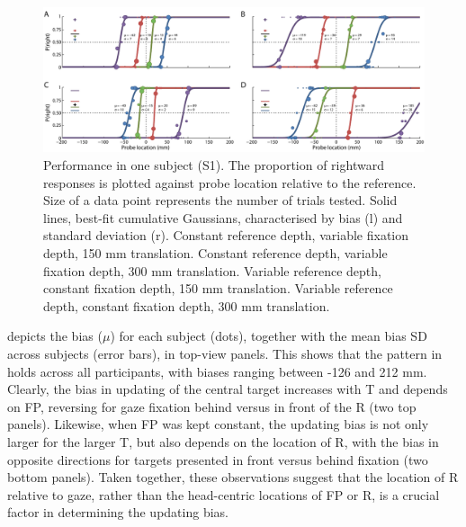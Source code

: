 \begin{figure}
    \includegraphics[width=1.0\textwidth]{src/paper2/figure2.pdf}

    \caption{Performance in one subject (S1). The proportion of rightward responses is plotted against probe location relative to the reference. Size of a data point represents the number of trials tested. Solid lines, best-fit cumulative Gaussians, characterised by bias (l) and standard deviation (r).  Constant reference depth, variable fixation depth, 150 \si{\milli\metre} translation.  Constant reference depth, variable fixation depth, 300 \si{\milli\metre} translation.  Variable reference depth, constant fixation depth, 150 \si{\milli\metre} translation.  Variable reference depth, constant fixation depth, 300 \si{\milli\metre}  translation.}

    \label{p2:fig2}
\end{figure}

 depicts the bias ($\mu$) for each subject (dots), together with the mean bias {\textpm}SD across subjects (error bars), in top-view panels. This shows that the pattern in  holds across all participants, with biases ranging between -126 and 212 mm. Clearly, the bias in updating of the central target increases with T and depends on FP, reversing for gaze fixation behind versus in front of the R (two top panels). Likewise, when FP was kept constant, the updating bias is not only larger for the larger T, but also depends on the location of R, with the bias in opposite directions for targets presented in front versus behind fixation (two bottom panels). Taken together, these observations suggest that the location of R relative to gaze, rather than the head-centric locations of FP or R, is a crucial factor in determining the updating bias.

